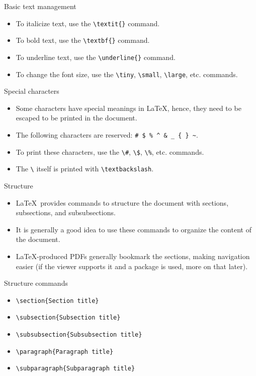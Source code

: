 \documentclass[t,12pt,xcolor=dvipsnames]{beamer}
\begin{document}
\begin{frame}{Basic text management}
    \begin{itemize}
        \item To italicize text, use the \texttt{\textbackslash textit\{\}} command.
        \item To bold text, use the \texttt{\textbackslash textbf\{\}} command.
        \item To underline text, use the \texttt{\textbackslash underline\{\}} command.
        \item To change the font size, use the \texttt{\textbackslash tiny}, \texttt{\textbackslash small}, \texttt{\textbackslash large}, etc. commands.
    \end{itemize}
\end{frame}

\begin{frame}{Special characters}
    \begin{itemize}
    \item Some characters have special meanings in \LaTeX, hence, they need to be escaped to be printed in the document.
    \item The following characters are reserved: \texttt{\# \$ \% \^{} \& \_ \{ \} \~{}}.
    \item To print these characters, use the \texttt{\textbackslash\#}, \texttt{\textbackslash\$}, \texttt{\textbackslash\%}, etc. commands.
    \item The \texttt{\textbackslash} itself is printed with \texttt{\textbackslash textbackslash}.
    \end{itemize}
\end{frame}

\begin{frame}{Structure}
    \begin{itemize}
        \item \LaTeX \ provides commands to structure the document with sections, subsections, and subsubsections.
        \item It is generally a good idea to use these commands to organize the content of the document.
        \item \LaTeX-produced PDFs generally bookmark the sections, making navigation easier (if the viewer supports it and a package is used, more on that later).
    \end{itemize}
\end{frame}
\begin{frame}{Structure commands}
    \begin{itemize}
        \item \texttt{\textbackslash section\{Section title\}}
        \item \texttt{\textbackslash subsection\{Subsection title\}}
        \item \texttt{\textbackslash subsubsection\{Subsubsection title\}}
        \item \texttt{\textbackslash paragraph\{Paragraph title\}}
        \item \texttt{\textbackslash subparagraph\{Subparagraph title\}}
    \end{itemize}
\end{frame}
\end{document}
